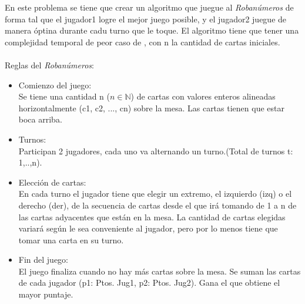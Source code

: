 \documentclass[11pt, a4paper, twoside]{article}
\begin{document}
{}

En este problema se tiene que crear un algoritmo que juegue al \textit{Robanúmeros} de forma tal 
que el jugador1 logre el mejor juego posible, y el jugador2 juegue de manera óptina durante cadu turno que le toque.
El algoritmo tiene que tener una complejidad temporal de peor caso de , con n la cantidad de cartas
iniciales.\\
\\
Reglas del \textit{Robanúmeros}: 
\begin{itemize}
  \item Comienzo del juego: \\
  Se tiene una cantidad n ($n \in \mathbb{N}$) de cartas con valores enteros alineadas
  horizontalmente (c1, c2, ..., cn) sobre la mesa. Las cartas tienen que estar boca arriba. 
  \item Turnos: \\
  Participan 2 jugadores, cada uno va alternando un turno.(Total de turnos t: 1,..,n).  
  \item Elección de cartas: \\
  En cada turno el jugador tiene que elegir un extremo, el izquierdo (izq) o el derecho (der), de 
  la secuencia de cartas desde el que irá tomando de 1 a n de las cartas adyacentes que están en la mesa. 
  La cantidad de cartas elegidas variará según le sea conveniente al jugador, pero por lo menos tiene que tomar una 
  carta en su turno. 
  \item Fin del juego: \\
  El juego finaliza cuando no hay más cartas sobre la mesa. Se suman las cartas de cada 
  jugador (p1: Ptos. Jug1, p2: Ptos. Jug2). Gana el que obtiene el mayor puntaje.
\end{itemize}
\end{document}
